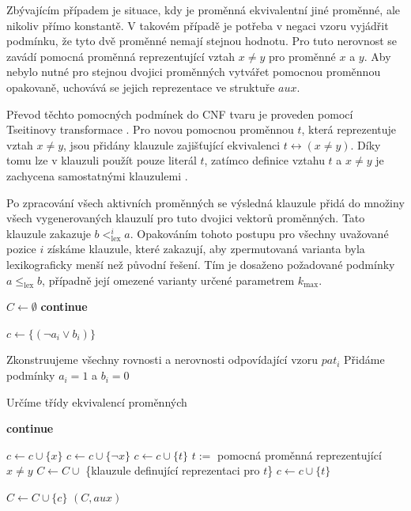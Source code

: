 Zbývajícím případem je situace, kdy je proměnná ekvivalentní jiné proměnné, ale nikoliv přímo konstantě. V takovém případě je potřeba v negaci vzoru vyjádřit podmínku, že tyto dvě proměnné nemají stejnou hodnotu. Pro tuto nerovnost se zavádí pomocná proměnná reprezentující vztah $x \neq y$ pro proměnné $x$ a $y$. Aby nebylo nutné pro stejnou dvojici proměnných vytvářet pomocnou proměnnou opakovaně, uchovává se jejich reprezentace ve struktuře $aux$.

Převod těchto pomocných podmínek do CNF tvaru je proveden pomocí Tseitinovy transformace \cite{tseitin68}. Pro novou pomocnou proměnnou $t$, která reprezentuje vztah $x \neq y$, jsou přidány klauzule zajišťující ekvivalenci
$t \leftrightarrow (x \neq y)$.
Díky tomu lze v klauzuli použít pouze literál $t$, zatímco definice vztahu $t$ a $x \neq y$ je zachycena samostatnými klauzulemi \cite{tseitin68}.

Po zpracování všech aktivních proměnných se výsledná klauzule přidá do množiny všech vygenerovaných klauzulí pro tuto dvojici vektorů proměnných. Tato klauzule zakazuje $b <^i_{\mathrm{lex}} a$. Opakováním tohoto postupu pro všechny uvažované pozice $i$ získáme klauzule, které zakazují, aby zpermutovaná varianta byla lexikograficky menší než původní řešení. Tím je dosaženo požadované podmínky $a \leq_{\text{lex}} b$, případně její omezené varianty určené parametrem $k_{\max}$.


\begin{algorithm}[H]
\caption{Generování klauzulí z porovnání dvou vektorů proměnných}
\begin{algorithmic}[1]
\State $C\gets\emptyset$
\State \textbf{continue}
\EndIf

    	\State $c\gets \{(\neg a_i\vee b_i)\}$

    	\State Zkonstruujeme všechny rovnosti a nerovnosti odpovídající vzoru $pat_i$
    	\State Přidáme podmínky $a_i=1$ a $b_i=0$

    	\State Určíme třídy ekvivalencí proměnných

        	\State \textbf{continue}
    	\EndIf

            		\State $c \gets c \cup \{x\}$
            		\State  $c \gets c \cup  \{\neg x\}$
		 		\State $c \gets c \cup \{t\}$
	    		\Else
		 		\State $t :=$ pomocná proměnná reprezentující $x\neq y$
		 		\State $C \gets C \cup$ \{klauzule definující reprezentaci pro $t$\}
		 		\State $c \gets c \cup \{t\}$
	    		\EndIf
        	\EndIf
   	\EndFor

    	\State $C\gets C\cup\{c\}$
\EndFor
\State \Return $(C,aux)$

\EndFunction
\end{algorithmic}
\end{algorithm}

